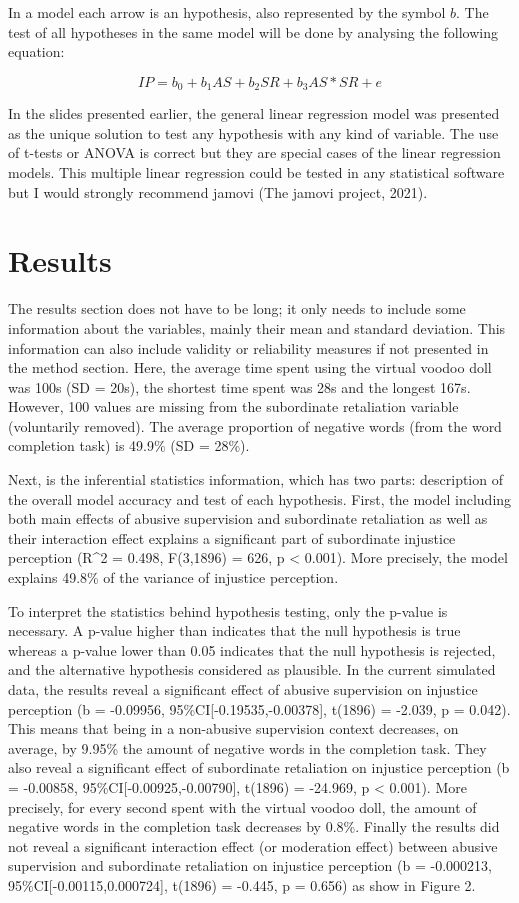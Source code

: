 \documentclass[
]{article}
\begin{document}
In a model each arrow is an hypothesis, also represented by the symbol
\(b\). The test of all hypotheses in the same model will be done by
analysing the following equation:

\[ IP = b_0 + b_1 AS + b_2 SR + b_3 AS * SR + e \]

In the slides presented earlier, the general linear regression model was
presented as the unique solution to test any hypothesis with any kind of
variable. The use of t-tests or ANOVA is correct but they are special
cases of the linear regression models. This multiple linear regression
could be tested in any statistical software but I would strongly
recommend jamovi (The jamovi project, 2021).

\hypertarget{results}{%
\section{Results}\label{results}}

The results section does not have to be long; it only needs to include
some information about the variables, mainly their mean and standard
deviation. This information can also include validity or reliability
measures if not presented in the method section. Here, the average time
spent using the virtual voodoo doll was 100s (SD = 20s), the shortest
time spent was 28s and the longest 167s. However, 100 values are missing
from the subordinate retaliation variable (voluntarily removed). The
average proportion of negative words (from the word completion task) is
49.9\% (SD = 28\%).

Next, is the inferential statistics information, which has two parts:
description of the overall model accuracy and test of each hypothesis.
First, the model including both main effects of abusive supervision and
subordinate retaliation as well as their interaction effect explains a
significant part of subordinate injustice perception (R\^{}2 = 0.498,
F(3,1896) = 626, p \textless{} 0.001). More precisely, the model
explains 49.8\% of the variance of injustice perception.

To interpret the statistics behind hypothesis testing, only the p-value
is necessary. A p-value higher than indicates that the null hypothesis
is true whereas a p-value lower than 0.05 indicates that the null
hypothesis is rejected, and the alternative hypothesis considered as
plausible. In the current simulated data, the results reveal a
significant effect of abusive supervision on injustice perception (b =
-0.09956, 95\%CI{[}-0.19535,-0.00378{]}, t(1896) = -2.039, p = 0.042).
This means that being in a non-abusive supervision context decreases, on
average, by 9.95\% the amount of negative words in the completion task.
They also reveal a significant effect of subordinate retaliation on
injustice perception (b = -0.00858, 95\%CI{[}-0.00925,-0.00790{]},
t(1896) = -24.969, p \textless{} 0.001). More precisely, for every
second spent with the virtual voodoo doll, the amount of negative words
in the completion task decreases by 0.8\%. Finally the results did not
reveal a significant interaction effect (or moderation effect) between
abusive supervision and subordinate retaliation on injustice perception
(b = -0.000213, 95\%CI{[}-0.00115,0.000724{]}, t(1896) = -0.445, p =
0.656) as show in Figure 2.
\end{document}
